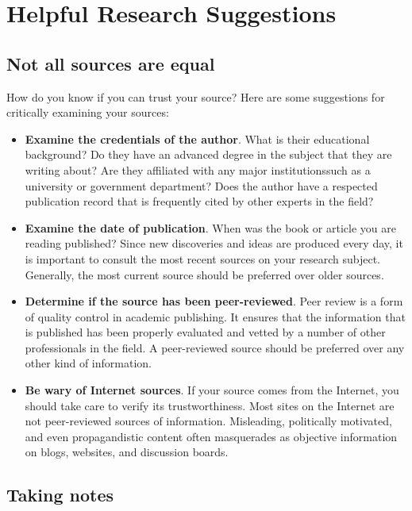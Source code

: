 {\section{Helpful Research Suggestions}

\subsection{Not all sources are equal}

How do you know if you can trust your source? Here are some suggestions for 
critically examining your sources:

\begin{itemize}
\item \textbf{Examine the credentials of the author}. What is their educational 
background? Do they have an advanced degree in the subject that they are 
writing about? Are they affiliated with any major institutions\textemdash such 
as a university or government department? Does the author have a respected 
publication record that is frequently cited by other experts in the field?

\item \textbf{Examine the date of publication}. When was the book or article 
you are reading published? Since new discoveries and ideas are produced every 
day, it is important to consult the most recent sources on your research 
subject. Generally, the most current source should be preferred over older 
sources.

\item \textbf{Determine if the source has been peer-reviewed}. Peer review is a 
form of quality control in academic publishing. It ensures that the information 
that is published has been properly evaluated and vetted by a number of other 
professionals in the field. A peer-reviewed source should be preferred over any 
other kind of information.

\item \textbf{Be wary of Internet sources}. If your source comes from the 
Internet, you should take care to verify its trustworthiness. Most sites on the 
Internet are not peer-reviewed sources of information. Misleading, politically 
motivated, and even propagandistic content often masquerades as objective 
information on blogs, websites, and discussion boards. 
\end{itemize}

\subsection{Taking notes}

}
